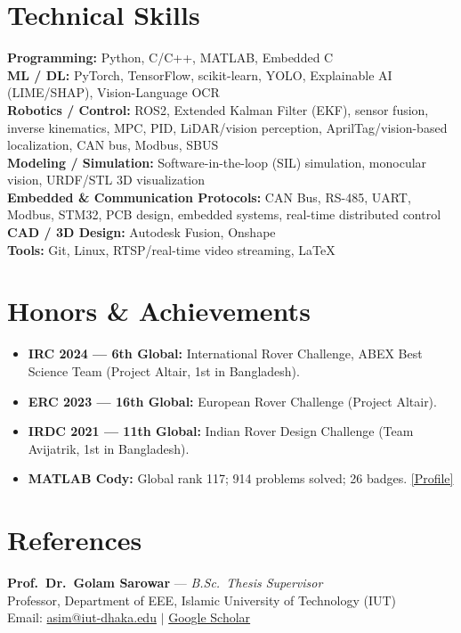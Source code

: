 \documentclass[10.5pt,letterpaper]{article}
\begin{document}
\section*{Technical Skills}
\textbf{Programming:} Python, C/C++, MATLAB, Embedded C \\
\textbf{ML / DL:} PyTorch, TensorFlow, scikit-learn, YOLO, Explainable AI (LIME/SHAP), Vision-Language OCR \\
\textbf{Robotics / Control:} ROS2, Extended Kalman Filter (EKF), sensor fusion, inverse kinematics, MPC, PID, LiDAR/vision perception, AprilTag/vision-based localization, CAN bus, Modbus, SBUS \\
\textbf{Modeling / Simulation:} Software-in-the-loop (SIL) simulation, monocular vision, URDF/STL 3D visualization \\
\textbf{Embedded \& Communication Protocols:} CAN Bus, RS-485, UART, Modbus, STM32, PCB design, embedded systems, real-time distributed control \\
\textbf{CAD / 3D Design:} Autodesk Fusion, Onshape \\
\textbf{Tools:} Git, Linux, RTSP/real-time video streaming, LaTeX

\section*{Honors \& Achievements}
\begin{itemize}
    \item \textbf{IRC 2024 --- 6th Global:} International Rover Challenge, ABEX Best Science Team (Project Altair, 1st in Bangladesh).
    \item \textbf{ERC 2023 --- 16th Global:} European Rover Challenge (Project Altair).
    \item \textbf{IRDC 2021 --- 11th Global:} Indian Rover Design Challenge (Team Avijatrik, 1st in Bangladesh).
    \item \textbf{MATLAB Cody:} Global rank 117; 914 problems solved; 26 badges. \href{https://www.mathworks.com/matlabcentral/profile/authors/25804044}{[Profile]}
\end{itemize}

\section*{References}
\textbf{Prof.\ Dr.\ Golam Sarowar} --- \textit{B.Sc.\ Thesis Supervisor} \\
Professor, Department of EEE, Islamic University of Technology (IUT) \\
Email: \href{mailto:asim@iut-dhaka.edu}{asim@iut-dhaka.edu} \quad $\vert$ \quad
\href{https://scholar.google.com/citations?user=3waAWaYAAAAJ&hl=en}{Google Scholar}
\end{document}

